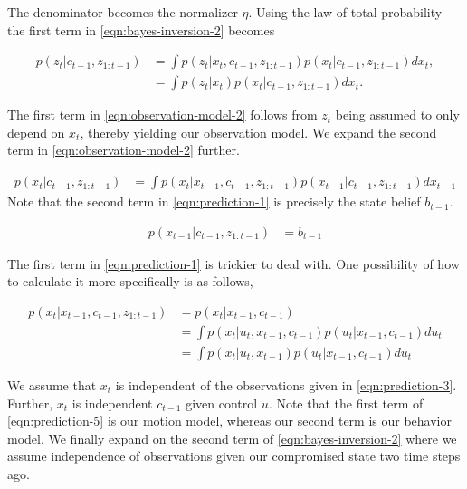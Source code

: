 \documentclass{article}
\begin{document}
The denominator becomes the normalizer $\eta$.
Using the law of total probability the first term in \eqref{eqn:bayes-inversion-2} becomes

\begin{align}
  p(z_{t}| c_{t-1}, z_{1:t-1}) &= 
  \int 
  p(z_{t}| x_{t}, c_{t-1}, z_{1:t-1}) 
  p(x_{t}| c_{t-1}, z_{1:t-1}) 
  dx_{t},
  \label{eqn:observation-model-1}                           \\
  &= 
  \int 
  p(z_{t}| x_{t}) p(x_{t}| c_{t-1}, z_{1:t-1})
  dx_{t}.
  \label{eqn:observation-model-2}
\end{align}

The first term in \eqref{eqn:observation-model-2} follows from $z_{t}$ being assumed to only depend on $x_{t}$, thereby yielding our observation model.
We expand the second term in \eqref{eqn:observation-model-2} further.

\begin{align}
  p(x_{t}| c_{t-1}, z_{1:t-1}) 
  &= 
  \int 
  p(x_{t}|x_{t-1}, c_{t-1},z_{1:t-1})
  p(x_{t-1}| c_{t-1}, z_{1:t-1})
  dx_{t-1}
  \label{eqn:prediction-1}
\end{align}
Note that the second term in \eqref{eqn:prediction-1} is precisely the state belief $b_{t-1}$.

\begin{align}
  p(x_{t-1}| c_{t-1}, z_{1:t-1})
  &= b_{t-1}
  \label{eqn:prediction-2}
\end{align}

The first term in \eqref{eqn:prediction-1} is trickier to deal with.
One possibility of how to calculate it more specifically is as follows,

\begin{align}
  p(x_{t}|x_{t-1}, c_{t-1},z_{1:t-1})
  &= 
  p(x_{t}|x_{t-1}, c_{t-1})
  \label{eqn:prediction-3}                               \\
  &=
  \int 
  p(x_{t}|u_{t}, x_{t-1}, c_{t-1})
  p(u_{t}|x_{t-1}, c_{t-1})
  du_{t}
  \label{eqn:prediction-4}                               \\
  &=
  \int 
  p(x_{t}|u_{t}, x_{t-1})
  p(u_{t}|x_{t-1}, c_{t-1})
  du_{t}
  \label{eqn:prediction-5}
\end{align}

We assume that $x_{t}$ is independent of the observations given in \eqref{eqn:prediction-3}. Further, $x_{t}$ is independent $c_{t-1}$ given control $u$. Note that the first term of \eqref{eqn:prediction-5} is our motion model, whereas our second term is our behavior model.
We finally expand on the second term of \eqref{eqn:bayes-inversion-2} where we assume independence of observations given our compromised state two time steps ago.
\end{document}
